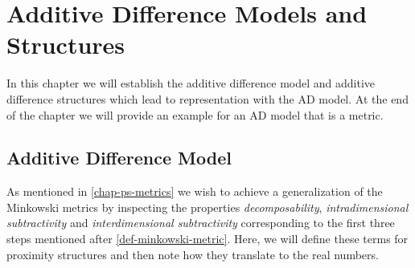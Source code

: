 \chapter{Additive Difference Models and Structures} \label{chap-AD-model-and-ps}
In this chapter we will establish the additive difference model and additive difference structures which lead to representation with the AD model. At the end of the chapter we will provide an example for an AD model that is a metric.

\section{Additive Difference Model} \label{sec-ad-model}

As mentioned in \cref{chap-ps-metrics} we wish to achieve a generalization of the Minkowski metrics by inspecting the properties \emph{decomposability}, \emph{intradimensional subtractivity} and \emph{interdimensional subtractivity} corresponding to the first three steps mentioned after \cref{def-minkowski-metric}.
Here, we will define these terms for proximity structures and then note how they translate to the real numbers.

